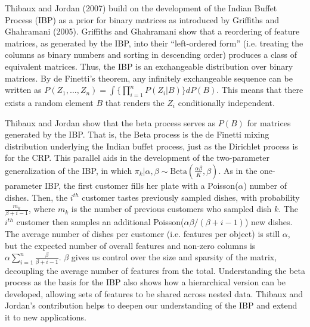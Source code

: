 \documentclass[12pt,letterpaper]{article}
\begin{document}


Thibaux and Jordan (2007) build on the development of the Indian Buffet Process (IBP) as a prior for binary matrices as introduced by Griffiths and Ghahramani (2005). Griffiths and Ghahramani show that a reordering of feature matrices, as generated by the IBP, into their ``left-ordered form'' (i.e. treating the columns as binary numbers and sorting in descending order) produces a class of equivalent matrices. Thus, the IBP is an exchangeable distribution over binary matrices. By de Finetti's theorem, any infinitely exchangeable sequence can be written as $P(Z_1, \ldots, Z_n) = \int \{ \prod_{i=1}^n P(Z_i | B) \} d P(B)$. This means that there exists a random element $B$ that renders the $Z_i$ conditionally independent. 


Thibaux and Jordan show that the beta process serves as $P(B)$ for matrices generated by the IBP. That is, the Beta process is the de Finetti mixing distribution underlying the Indian buffet process, just as the Dirichlet process is for the CRP. This parallel aids in the development of the two-parameter generalization of the IBP, in which $\pi_k | \alpha, \beta \sim \text{Beta}(\frac{\alpha \beta}{K}, \beta)$. As in the one-parameter IBP, the first customer fills her plate with a Poisson($\alpha$) number of dishes. Then, the $i^{th}$ customer tastes previously sampled dishes, with probability $\frac{m_k}{\beta + i - 1}$, where $m_k$ is the number of previous customers who sampled dish $k$. The $i^{th}$ customer then samples an additional Poisson($\alpha \beta /(\beta+i-1)$) new dishes. The average number of dishes per customer (i.e. features per object) is still $\alpha$, but the expected number of overall features and non-zero columns is $\alpha \sum_{i=1}^n \frac{\beta}{\beta+i-1}$. $\beta$ gives us control over the size and sparsity of the matrix, decoupling the average number of features from the total. Understanding the beta process as the basis for the IBP also shows how a hierarchical version can be developed, allowing sets of features to be shared across nested data. Thibaux and Jordan's contribution helps to deepen our understanding of the IBP and extend it to new applications.
\end{document}
